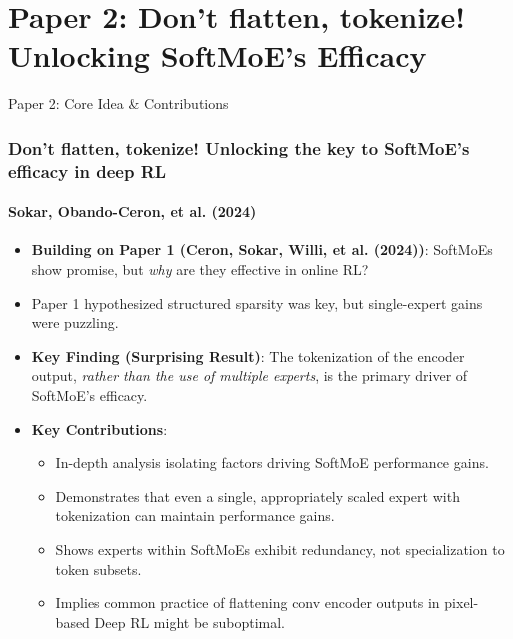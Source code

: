 \documentclass{beamer}
\newcommand{\ceronMoE}{Ceron, Sokar, Willi, et al. (2024)}
\newcommand{\sokarTokenize}{Sokar, Obando-Ceron, et al. (2024)}
\begin{document}
\section{Paper 2: Don't flatten, tokenize! Unlocking SoftMoE's Efficacy}
\begin{frame}{Paper 2: Core Idea & Contributions}
    \frametitle{Don't flatten, tokenize! Unlocking the key to SoftMoE's efficacy in deep RL}
    \framesubtitle{\sokarTokenize{}}
  \begin{itemize}
    \item \textbf{Building on Paper 1 (\ceronMoE{})}: SoftMoEs show promise, but \textit{why} are they effective in online RL?
    \item Paper 1 hypothesized structured sparsity was key, but single-expert gains were puzzling.
    \item \textbf{Key Finding (Surprising Result)}: The tokenization of the encoder output, \textit{rather than the use of multiple experts}, is the primary driver of SoftMoE's efficacy.
    \item \textbf{Key Contributions}:
    \begin{itemize}
        \item In-depth analysis isolating factors driving SoftMoE performance gains.
        \item Demonstrates that even a single, appropriately scaled expert with tokenization can maintain performance gains.
        \item Shows experts within SoftMoEs exhibit redundancy, not specialization to token subsets.
        \item Implies common practice of flattening conv encoder outputs in pixel-based Deep RL might be suboptimal.
    \end{itemize}
  \end{itemize}
\end{frame}
\end{document}

